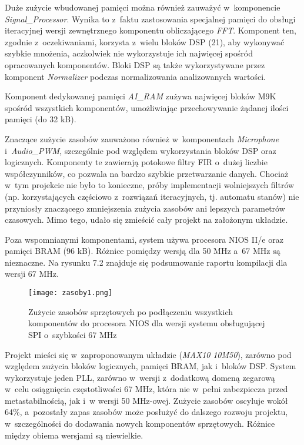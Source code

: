 Duże zużycie wbudowanej pamięci można również zauważyć w~komponencie \textit{Signal\_Processor}. Wynika to z~faktu zastosowania specjalnej pamięci do obsługi iteracyjnej wersji zewnętrznego komponentu obliczającego \textit{FFT}. Komponent ten, zgodnie z~oczekiwaniami, korzysta z~wielu bloków DSP (21), aby wykonywać szybkie mnożenia, aczkolwiek nie wykorzystuje ich najwięcej spośród opracowanych komponentów. Bloki DSP są także wykorzystywane przez komponent \textit{Normalizer} podczas normalizowania analizowanych wartości.

Komponent dedykowanej pamięci \textit{AI\_RAM} zużywa najwięcej bloków M9K spośród wszystkich komponentów, umożliwiając przechowywanie żądanej ilości pamięci (do 32 kB).

Znaczące zużycie zasobów zauważono również w~komponentach \textit{Microphone} i~\textit{Audio\_PWM}, szczególnie pod względem wykorzystania bloków DSP oraz logicznych. Komponenty te zawierają potokowe filtry FIR o~dużej liczbie współczynników, co pozwala na bardzo szybkie przetwarzanie danych. Chociaż w~tym projekcie nie było to konieczne, próby implementacji wolniejszych filtrów (np. korzystających częściowo z~rozwiązań iteracyjnych, tj. automatu stanów) nie przyniosły znaczącego zmniejszenia zużycia zasobów ani lepszych parametrów czasowych. Mimo tego, udało się zmieścić cały projekt na założonym układzie.

Poza wspomnianymi komponentami, system używa procesora NIOS II/e oraz pamięci BRAM (96 kB). Różnice pomiędzy wersją dla 50 MHz a~67 MHz są nieznaczne. Na rysunku 7.2 znajduje się podsumowanie raportu kompilacji dla wersji 67 MHz.

\begin{figure}[h]
	\centering
	\texttt{[image: zasoby1.png]}
	\caption{Zużycie zasobów sprzętowych po podłączeniu wszystkich komponentów do procesora NIOS dla wersji systemu obsługującej SPI o~szybkości 67 MHz}
\end{figure}
\FloatBarrier %

Projekt mieści się w~zaproponowanym układzie (\textit{MAX10} \textit{10M50}), zarówno pod względem zużycia bloków logicznych, pamięci BRAM, jak i~bloków DSP. System wykorzystuje jeden PLL, zarówno w~wersji z~dodatkową domeną zegarową w~celu osiągnięcia częstotliwości 67 MHz, która nie w~pełni zabezpiecza przed metastabilnością, jak i~w wersji 50 MHz-owej. Zużycie zasobów oscyluje wokół 64\%, a~pozostały zapas zasobów może posłużyć do dalszego rozwoju projektu, w~szczególności do dodawania nowych komponentów sprzętowych. Różnice między obiema wersjami są niewielkie.

